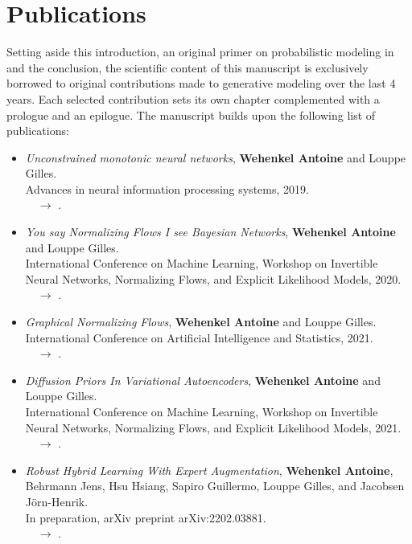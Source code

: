 \section{Publications}
Setting aside this introduction, an original primer on probabilistic modeling in  and the conclusion,
the scientific content of this manuscript is exclusively borrowed to original contributions made to generative modeling over the last 4 years.
Each selected contribution sets its own chapter complemented with a prologue and an epilogue.
The manuscript builds upon the following list of publications:

\begin{tcolorbox}[width=\textwidth,colback={grey},title={List of publications},outer arc=0mm,coltitle=white]

  \begin{itemize}
  \item[] \citep{wehenkel_unconstrained_2019} \textit{Unconstrained monotonic neural networks},
  \textbf{Wehenkel Antoine} and Louppe Gilles.\\
  Advances in neural information processing systems, 2019.\\
  $\quad \rightarrow$ .

  \item[] \citep{wehenkel_you_2020} \textit{You say Normalizing Flows I see Bayesian Networks},
  \textbf{Wehenkel Antoine} and Louppe Gilles.\\
  International Conference on Machine Learning, Workshop on Invertible Neural Networks, Normalizing Flows, and Explicit Likelihood Models, 2020.\\
  $\quad \rightarrow$ .

  \item[] \citep{wehenkel2021graphical} \textit{Graphical Normalizing Flows},
  \textbf{Wehenkel Antoine} and Louppe Gilles.\\
  International Conference on Artificial Intelligence and Statistics, 2021.\\
  $\quad \rightarrow$ .

  \item[] \citep{wehenkel2021diffusion} \textit{Diffusion Priors In Variational Autoencoders},
  \textbf{Wehenkel Antoine} and Louppe Gilles.\\
  International Conference on Machine Learning, Workshop on Invertible Neural Networks, Normalizing Flows, and Explicit Likelihood Models, 2021.\\
  $\quad \rightarrow$ .

  \item[] \citep{wehenkel2022robust} \textit{Robust Hybrid Learning With Expert Augmentation},
  \textbf{Wehenkel Antoine}, Behrmann Jens, Hsu Hsiang, Sapiro Guillermo, Louppe Gilles, and Jacobsen J{\"o}rn-Henrik.\\
  In preparation, arXiv preprint arXiv:2202.03881.\\
  $\quad \rightarrow$ .

  \end{itemize}
\end{tcolorbox}


